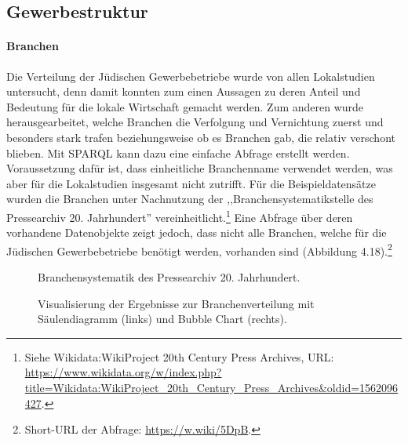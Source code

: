 \subsection{Gewerbestruktur}

\paragraph{Branchen} Die Verteilung der Jüdischen Gewerbebetriebe wurde von allen Lokalstudien untersucht, denn damit konnten zum einen Aussagen zu deren Anteil und Bedeutung für die lokale Wirtschaft gemacht werden. Zum anderen wurde herausgearbeitet, welche Branchen die Verfolgung und Vernichtung zuerst und besonders stark trafen beziehungsweise ob es Branchen gab, die relativ verschont blieben. Mit SPARQL kann dazu eine einfache Abfrage erstellt werden. Voraussetzung dafür ist, dass einheitliche Branchenname verwendet werden, was aber für die Lokalstudien insgesamt nicht zutrifft. Für die Beispieldatensätze wurden die Branchen unter Nachnutzung der ,,Branchensystematikstelle des Pressearchiv 20. Jahrhundert'' vereinheitlicht.\footnote{Siehe Wikidata:WikiProject 20th Century Press Archives, URL: \url{https://www.wikidata.org/w/index.php?title=Wikidata:WikiProject\_20th\_Century\_Press\_Archives\&oldid=1562096427}.} Eine Abfrage über deren vorhandene Datenobjekte zeigt jedoch, dass nicht alle Branchen, welche für die Jüdischen Gewerbebetriebe benötigt werden, vorhanden sind (Abbildung 4.18).\footnote{Short-URL der Abfrage: \url{https://w.wiki/5DpB}.} 

\begin{figure}[h]
    \centering
    \caption{Branchensystematik des Pressearchiv 20. Jahrhundert.}
    \label{fig:x cubed graph}
\end{figure}

\begin{figure}[h]
    \centering
    \caption{Visualisierung der Ergebnisse zur Branchenverteilung mit Säulendiagramm (links) und Bubble Chart (rechts).}
    \label{fig:x cubed graph}
\end{figure}

